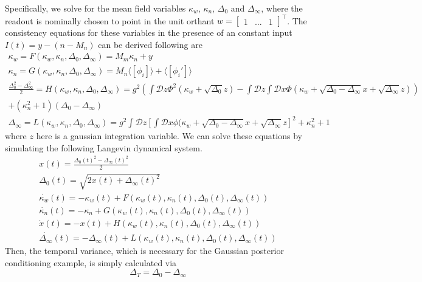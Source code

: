 \documentclass[11pt]{article}
\begin{document}
Specifically, we solve for the mean field variables $\kappa_w$, $\kappa_n$, $\Delta_0$ and $\Delta_\infty$, where the readout is nominally chosen to point in the unit orthant $w= \begin{bmatrix} 1 & ... & 1 \end{bmatrix}^\top$.  The consistency equations for these variables in the presence of an constant input $I(t) = y - (n - M_n)$ can be derived following \cite{mastrogiuseppe2018linking} are
\begin{equation}
\begin{split}
\kappa_w = F(\kappa_w, \kappa_n, \Delta_0, \Delta_\infty) = M_m \kappa_n + y \\
\kappa_n = G(\kappa_w, \kappa_n, \Delta_0, \Delta_\infty) = M_n \langle \left[ \phi_i \right] \rangle + \langle \left[ \phi_i' \right] \rangle \\
\frac{\Delta_0^2-\Delta_\infty^2}{2} = H(\kappa_w, \kappa_n, \Delta_0, \Delta_\infty) = g^2 \left( \int \mathcal{D}z \Phi^2(\kappa_w + \sqrt{\Delta_0}z) - \int \mathcal{D}z \int \mathcal{D}x \Phi(\kappa_w + \sqrt{\Delta_0 - \Delta_\infty}x + \sqrt{\Delta_\infty}z)  \right) \\
+ (\kappa_n^2  + 1)(\Delta_0-\Delta_\infty) \\
\Delta_\infty = L(\kappa_w, \kappa_n, \Delta_0, \Delta_\infty)  = g^2 \int \mathcal{D}z \left[ \int \mathcal{D}x \phi(\kappa_w + \sqrt{\Delta_0 - \Delta_\infty}x + \sqrt{\Delta_\infty}z \right]^2 + \kappa_n^2 + 1
\end{split} 
\end{equation}
where $z$ here is a gaussian integration variable. We can solve these equations by simulating the following Langevin dynamical system.
\begin{equation}
\begin{split}
x(t) = \frac{\Delta_0(t)^2-\Delta_\infty(t)^2}{2} \\
\Delta_0(t) = \sqrt{2x(t) + \Delta_\infty(t)^2} \\
\dot{\kappa_w}(t) = -\kappa_w(t) + F(\kappa_w(t), \kappa_n(t), \Delta_0(t), \Delta_\infty(t)) \\
\dot{\kappa_n}(t) = -\kappa_n + G(\kappa_w(t), \kappa_n(t), \Delta_0(t), \Delta_\infty(t)) \\
\dot{x}(t) = -x(t) + H(\kappa_w(t), \kappa_n(t), \Delta_0(t), \Delta_\infty(t)) \\
\dot{\Delta_\infty}(t) = -\Delta_\infty(t) + L(\kappa_w(t), \kappa_n(t), \Delta_0(t), \Delta_\infty(t))
\end{split}
\end{equation}
Then, the temporal variance, which is necessary for the Gaussian posterior conditioning example, is simply calculated via
\begin{equation}
\Delta_T = \Delta_0 - \Delta_\infty
\end{equation}
\end{document}
